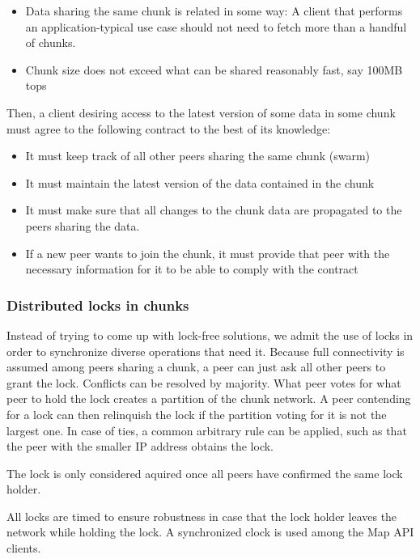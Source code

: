 \documentclass{article}
\begin{document}
\begin{itemize}
  \itemsep0em
  \item Data sharing the same chunk is related in some way: A client that
    performs an application-typical use case should not need to fetch more than
    a handful of chunks.
  \item Chunk size does not exceed what can be shared reasonably fast, say
    100MB tops
\end{itemize}

Then, a client desiring access to the latest version of some data in some chunk
must agree to the following contract to the best of its knowledge:

\begin{itemize}
  \itemsep0em
  \item It must keep track of all other peers sharing the same chunk (swarm)
  \item It must maintain the latest version of the data contained in the chunk
  \item It must make sure that all changes to the chunk data are propagated to
    the peers sharing the data.
  \item If a new peer wants to join the chunk, it must provide that peer with
    the necessary information for it to be able to comply with the contract
\end{itemize}

\subsubsection{Distributed locks in chunks}

Instead of trying to come up with lock-free solutions, we admit the use of
locks in order to synchronize diverse operations that need it. Because full
connectivity is assumed among peers sharing a chunk, a peer can just ask all
other peers to grant the lock. Conflicts can be resolved by majority. What peer
votes for what peer to hold the lock creates a partition of the chunk network.
A peer contending for a lock can then relinquish the lock if the partition 
voting for it is not the largest one. In case of ties, a common arbitrary rule
can be applied, such as that the peer with the smaller IP address obtains the
lock.

The lock is only considered aquired once all peers have confirmed the same lock
holder.

All locks are timed to ensure robustness in case that the lock holder leaves
the network while holding the lock. A synchronized clock is used among the
Map API clients.
\end{document}
